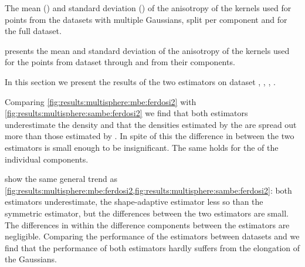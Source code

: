 	\begin{table*}
		\centering
		
		\caption{The mean (\mean) and standard deviation (\SD) of the anisotropy of the kernels used for points from the datasets with multiple Gaussians, split per component and for the full dataset.} 	
		\label{tab:results:multiSphere:anisotropy}
	\end{table*}
	 presents the mean and standard deviation of the anisotropy of the kernels used for the points from dataset \ferdosiTwo through \baakmanThree and from their components. 















\oldStuff

	In this section we present the results of the two estimators on dataset \ferdosiTwo, \baakmanTwo, \ferdosiThree, \baakmanThree.

	Comparing \cref{fig:results:multisphere:mbe:ferdosi2} with \cref{fig:results:multisphere:sambe:ferdosi2} we find that both estimators underestimate the density and that the densities estimated by the \sambe are spread out more than those estimated by \mbe. In spite of this the difference in \mse between the two estimators is small enough to be insignificant. 
	The same holds for the \mse of the individual components.

	 show the same general trend as \cref{fig:results:multisphere:mbe:ferdosi2,fig:results:multisphere:sambe:ferdosi2}: both estimators underestimate, the shape-adaptive estimator less so than the symmetric estimator, but the differences between the two estimators are small. 
	The differences in \MSE within the difference components between the estimators are negligible. 
	Comparing the performance of the estimators between datasets \ferdosiTwo and \baakmanTwo we find that the performance of both estimators hardly suffers from the elongation of the Gaussians. 

